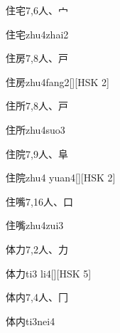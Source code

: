 \begin{entry}{住宅}{7,6}{⼈、⼧}
  \begin{phonetics}{住宅}{zhu4zhai2}
  \end{phonetics}
\end{entry}

\begin{entry}{住房}{7,8}{⼈、⼾}
  \begin{phonetics}{住房}{zhu4fang2}[][HSK 2]
  \end{phonetics}
\end{entry}

\begin{entry}{住所}{7,8}{⼈、⼾}
  \begin{phonetics}{住所}{zhu4suo3}
  \end{phonetics}
\end{entry}

\begin{entry}{住院}{7,9}{⼈、⾩}
  \begin{phonetics}{住院}{zhu4 yuan4}[][HSK 2]
  \end{phonetics}
\end{entry}

\begin{entry}{住嘴}{7,16}{⼈、⼝}
  \begin{phonetics}{住嘴}{zhu4zui3}
  \end{phonetics}
\end{entry}

\begin{entry}{体力}{7,2}{⼈、⼒}
  \begin{phonetics}{体力}{ti3 li4}[][HSK 5]
  \end{phonetics}
\end{entry}

\begin{entry}{体内}{7,4}{⼈、⼌}
  \begin{phonetics}{体内}{ti3nei4}
  \end{phonetics}
\end{entry}

